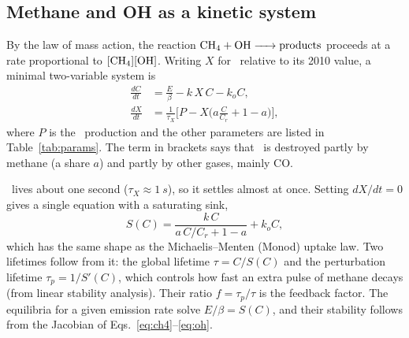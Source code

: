 \documentclass[11pt,a4paper]{article}
\newcommand{\CH}{\ce{CH4}}
\newcommand{\OH}{\ce{OH}}
\begin{document}
\subsection{Methane and OH as a kinetic system}
By the law of mass action, the reaction $\ce{CH4 + OH -> products}$ proceeds at a rate proportional to $[\CH][\OH]$. Writing $X$ for \OH\ relative to its 2010 value, a minimal two-variable system is
\begin{align}
\frac{dC}{dt}&=\frac{E}{\beta}-k\,X\,C-k_oC, \label{eq:ch4}\\
\frac{dX}{dt}&=\frac{1}{\tau_X}\Big[P-X\Big(a\frac{C}{C_r}+1-a\Big)\Big], \label{eq:oh}
\end{align}
where $P$ is the \OH\ production and the other parameters are listed in Table~\ref{tab:params}. The term in brackets says that \OH\ is destroyed partly by methane (a share $a$) and partly by other gases, mainly CO.

\OH\ lives about one second ($\tau_X\approx\SI{1}{s}$), so it settles almost at once. Setting $dX/dt=0$ gives a single equation with a saturating sink,
\begin{equation}
S(C)=\frac{k\,C}{a\,C/C_r+1-a}+k_oC,
\label{eq:sink}
\end{equation}
which has the same shape as the Michaelis--Menten (Monod) uptake law. Two lifetimes follow from it: the global lifetime $\tau=C/S(C)$ and the perturbation lifetime $\tau_p=1/S'(C)$, which controls how fast an extra pulse of methane decays (from linear stability analysis). Their ratio $f=\tau_p/\tau$ is the feedback factor. The equilibria for a given emission rate solve $E/\beta=S(C)$, and their stability follows from the Jacobian of Eqs.~\eqref{eq:ch4}--\eqref{eq:oh}.
\end{document}
